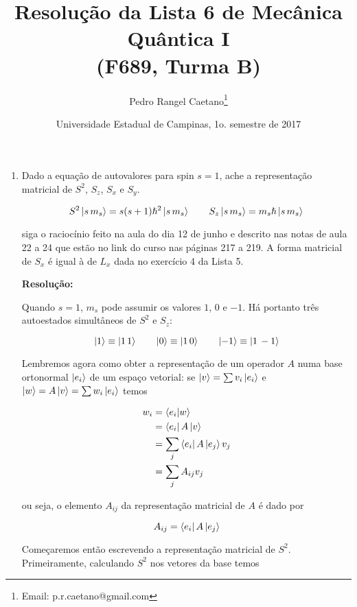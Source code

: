 \documentclass[a4paper, 12pt, notitlepage]{article}
\begin{document}
\title{Resolução da Lista 6 de Mecânica Quântica I\\ (F689, Turma B)}
\author{Pedro Rangel Caetano\footnote{Email: p.r.caetano@gmail.com}} 
\date{Universidade Estadual de Campinas, 1o. semestre de 2017}
\maketitle

\tableofcontents
\pagebreak


\begin{enumerate}
\item Dado a equação de autovalores para spin $s=1$, ache a representação matricial de $S^2$, $S_z$, $S_x$ e $S_y$.

\begin{equation}
S^2 \ket{s\,m_s} = s(s+1)\hslash^2\ket{s\,m_s} \qquad
S_z \ket{s\,m_s} = m_s \hslash \ket{s\,m_s}
\end{equation}

\noindent siga o raciocínio feito na aula do dia 12 de junho e descrito nas notas de aula 22 a 24 que estão no link do curso nas páginas 217 a 219. A forma matricial de $S_x$ é igual à de $L_x$ dada no exercício 4 da Lista 5.

\textbf{Resolução: }

Quando $s = 1$, $m_s$ pode assumir os valores $1$, $0$ e $-1$. Há portanto três autoestados simultâneos de $S^2$ e $S_z$:

\[
  \ket{1} \equiv \ket{1\,1} \qquad
  \ket{0} \equiv \ket{1\,0} \qquad
  \ket{-1} \equiv \ket{1\,-1}
\]

Lembremos agora como obter a representação de um operador $A$ numa base ortonormal $\ket{e_i}$ de um espaço vetorial: se $\ket{v} = \sum v_i \ket{e_i}$ e $\ket{w} = A\ket{v} = \sum w_i \ket{e_i}$ temos

\begin{align*}
  w_i &= \left\langle e_i | w\right\rangle \\
  &= \bra{e_i} A \ket{v} \\
  &= \sum_j \bra{e_i} A \ket{e_j} v_j \\
  &= \sum_j A_{ij} v_j
\end{align*}

\noindent ou seja, o elemento $A_{ij}$ da representação matricial de $A$ é dado por

\[ A_{ij} = \bra{e_i} A \ket{e_j} \]

Começaremos então escrevendo a representação matricial de $S^2$. Primeiramente, calculando $S^2$ nos vetores da base temos


\end{enumerate}
\end{document}
